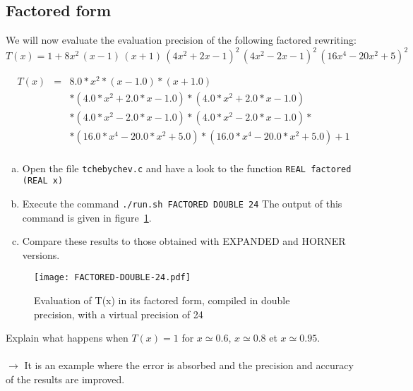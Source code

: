 \FloatBarrier

\subsection{Factored form}

We will now evaluate the evaluation precision of the following factored rewriting:
\[
	T(x) = 1 + 8x^2\,(x-1)\,(x+1)\,(4x^2 + 2x - 1)^2\, (4x^2 - 2x - 1)^2\,(16x^4 - 20x^2 + 5)^2
\]

\begin{eqnarray*}
T(x) &=& 8.0*x^2*(x - 1.0)*(x + 1.0) \\
 & & * (4.0*x^2 + 2.0*x - 1.0)*(4.0*x^2 + 2.0*x - 1.0) \\
 & & * (4.0*x^2 - 2.0*x - 1.0)*(4.0*x^2 - 2.0*x - 1.0)* \\
 & & * (16.0*x^4 - 20.0*x^2 + 5.0)*(16.0*x^4 - 20.0*x^2 + 5.0) + 1 \\
\end{eqnarray*}

\begin{question}
  \begin{enumerate}[(a)]
  \item Open the file {\tt tchebychev.c} and have a look to the function {\tt REAL factored (REAL x)}
\item Execute the command {\tt ./run.sh FACTORED DOUBLE 24} \newline
The output of this command is given in figure~\ref{fig:factored:double:24}.
\item Compare these results to those obtained with EXPANDED and HORNER versions.
  \end{enumerate}
\end{question}

\begin{figure}[h]
\center \texttt{[image: FACTORED-DOUBLE-24.pdf]}
  \caption{Evaluation of T(x) in its factored form, compiled in double precision, with a virtual precision of 24}
  \label{fig:factored:double:24}
\end{figure}

\begin{question}
  Explain what happens when $T(x)=1$ for $x\simeq 0.6$,
  $x\simeq 0.8$ et $x\simeq 0.95$.\\~\\
  $\rightarrow$ It is an example where the error is absorbed and the precision and accuracy  of the results are improved.
\end{question}


